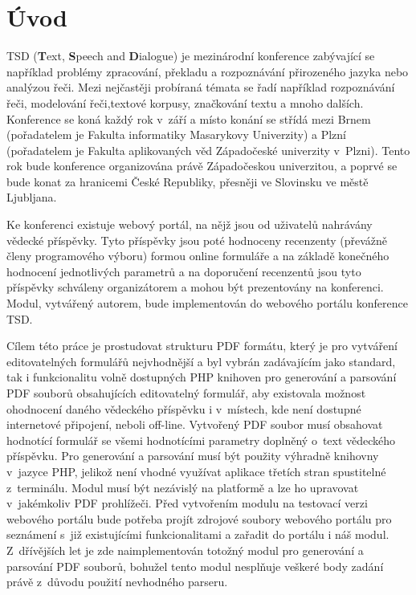 \chapter{Úvod}
TSD (\textbf{T}ext, \textbf{S}peech and \textbf{D}ialogue) je mezinárodní konference zabývající se například problémy zpracování, překladu a rozpoznávání přirozeného jazyka nebo analýzou řeči. Mezi nejčastěji probíraná témata se řadí například rozpoznávání řeči, modelování řeči,textové korpusy, značkování textu a mnoho dalších. Konference se koná každý rok v~září a místo konání se střídá mezi Brnem (pořadatelem je Fakulta informatiky Masarykovy Univerzity) a Plzní (pořadatelem je Fakulta aplikovaných věd Západočeské univerzity v~Plzni). Tento rok bude konference organizována právě Západočeskou univerzitou, a poprvé se bude konat za hranicemi České Republiky, přesněji ve Slovinsku ve městě Ljubljana.
\par
Ke konferenci existuje webový portál, na nějž jsou od uživatelů nahrávány vědecké příspěvky. Tyto příspěvky jsou poté hodnoceny recenzenty (převážně členy programového výboru) formou online formuláře a na základě konečného hodnocení jednotlivých parametrů a na doporučení recenzentů jsou tyto příspěvky schváleny organizátorem a mohou být prezentovány na konferenci. Modul, vytvářený autorem, bude implementován do webového portálu konference TSD.
\par
Cílem této práce je prostudovat strukturu PDF formátu, který je pro vytváření editovatelných formulářů nejvhodnější a byl vybrán zadávajícím jako standard, tak i funkcionalitu volně dostupných PHP knihoven pro generování a parsování PDF souborů obsahujících editovatelný formulář, aby existovala možnost ohodnocení daného vědeckého příspěvku i v~místech, kde není dostupné internetové připojení, neboli off-line. Vytvořený PDF soubor musí obsahovat hodnotící formulář se všemi hodnotícími parametry doplněný o~text vědeckého příspěvku. Pro generování a parsování musí být použity výhradně knihovny v~jazyce PHP, jelikož není vhodné využívat aplikace třetích stran spustitelné z~terminálu. Modul musí být nezávislý na platformě a lze ho upravovat v~jakémkoliv PDF prohlížeči. Před vytvořením modulu na testovací verzi webového portálu bude potřeba projít zdrojové soubory webového portálu pro seznámení s~již existujícími funkcionalitami a zařadit do portálu i náš modul. Z~dřívějších let je zde naimplementován totožný modul pro generování a parsování PDF souborů, bohužel tento modul nesplňuje veškeré body zadání právě z~důvodu použití nevhodného parseru.
 